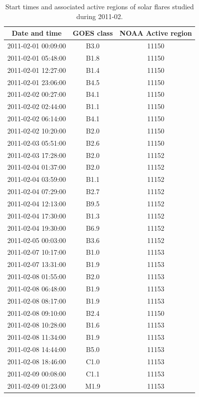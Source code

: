 \documentclass[referee,a4paper,12pt]{swsc}
\begin{document}
\begin{linenumbers}
\begin{longtable}{c|c|c}
	\caption{Start times and associated active regions of solar flares studied during 2011-02.}\\
		Date and time & GOES class & NOAA Active region \\
		\hline
		2011-02-01 00:09:00 & B3.0 & 11150 \\ 
		2011-02-01 05:48:00 & B1.8 & 11150 \\ 
		2011-02-01 12:27:00 & B1.4 & 11150 \\ 
		2011-02-01 23:06:00 & B4.5 & 11150 \\ 
		2011-02-02 00:27:00 & B4.1 & 11150 \\ 
		2011-02-02 02:44:00 & B1.1 & 11150 \\ 
		2011-02-02 06:14:00 & B4.1 & 11150 \\ 
		2011-02-02 10:20:00 & B2.0 & 11150 \\ 
		2011-02-03 05:51:00 & B2.6 & 11150 \\ 
		2011-02-03 17:28:00 & B2.0 & 11152 \\ 
		2011-02-04 01:37:00 & B2.0 & 11152 \\ 
		2011-02-04 03:59:00 & B1.1 & 11152 \\ 
		2011-02-04 07:29:00 & B2.7 & 11152 \\ 
		2011-02-04 12:13:00 & B9.5 & 11152 \\ 
		2011-02-04 17:30:00 & B1.3 & 11152 \\ 
		2011-02-04 19:30:00 & B6.9 & 11152 \\ 
		2011-02-05 00:03:00 & B3.6 & 11152 \\ 
		2011-02-07 10:17:00 & B1.0 & 11153 \\ 
		2011-02-07 13:31:00 & B1.9 & 11153 \\ 
		2011-02-08 01:55:00 & B2.0 & 11153 \\ 
		2011-02-08 06:48:00 & B1.9 & 11153 \\ 
		2011-02-08 08:17:00 & B1.9 & 11153 \\ 
		2011-02-08 09:10:00 & B2.4 & 11150 \\ 
		2011-02-08 10:28:00 & B1.6 & 11153 \\ 
		2011-02-08 11:34:00 & B1.9 & 11153 \\ 
		2011-02-08 14:44:00 & B5.0 & 11153 \\ 
		2011-02-08 18:46:00 & C1.0 & 11153 \\ 
		2011-02-09 00:08:00 & C1.1 & 11153 \\ 
		2011-02-09 01:23:00 & M1.9 & 11153 \\ 

\end{longtable}
\end{linenumbers}
\end{document}
